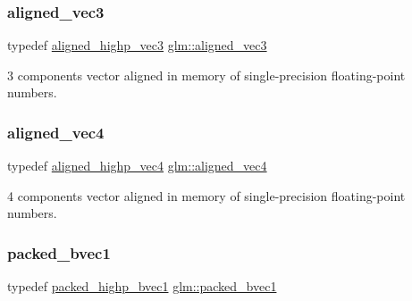 \subsubsection{\texorpdfstring{aligned\+\_\+vec3}{aligned\_vec3}}
{\footnotesize\ttfamily typedef \mbox{\hyperlink{group__gtc__type__aligned_ga9ddb18aa4936b5aa354fcefe179675af}{aligned\+\_\+highp\+\_\+vec3}} \mbox{\hyperlink{group__gtc__type__aligned_ga9c54536a3becfd10a44f6b1b8c4aa3d3}{glm\+::aligned\+\_\+vec3}}}



3 components vector aligned in memory of single-\/precision floating-\/point numbers. 

\mbox{\label{group__gtc__type__aligned_gad26d520694d7b865507819c2d9f2b196}} 
\subsubsection{\texorpdfstring{aligned\+\_\+vec4}{aligned\_vec4}}
{\footnotesize\ttfamily typedef \mbox{\hyperlink{group__gtc__type__aligned_ga60d6561b0daa150c617f3a7a277e44ee}{aligned\+\_\+highp\+\_\+vec4}} \mbox{\hyperlink{group__gtc__type__aligned_gad26d520694d7b865507819c2d9f2b196}{glm\+::aligned\+\_\+vec4}}}



4 components vector aligned in memory of single-\/precision floating-\/point numbers. 

\mbox{\label{group__gtc__type__aligned_ga9afdf9c24a30d7c6c46fa29011908ac5}} 
\subsubsection{\texorpdfstring{packed\+\_\+bvec1}{packed\_bvec1}}
{\footnotesize\ttfamily typedef \mbox{\hyperlink{group__gtc__type__aligned_ga00ef8acfca23dca78e1baa65bb5861ac}{packed\+\_\+highp\+\_\+bvec1}} \mbox{\hyperlink{group__gtc__type__aligned_ga9afdf9c24a30d7c6c46fa29011908ac5}{glm\+::packed\+\_\+bvec1}}}



